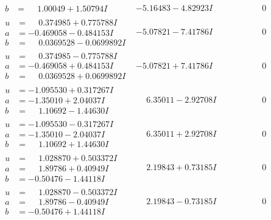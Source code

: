 \documentclass[1p]{elsarticle_modified}
\theoremstyle{definition}
\begin{document}
$$\begin{array}{c|c|c}
\begin{aligned}
b &= \phantom{-}1.00049 + 1.50794 I\end{aligned}
 & -5.16483 - 4.82923 I & \phantom{-0.000000 } 0 \\ \hline\begin{aligned}
u &= \phantom{-}0.374985 + 0.775788 I \\
a &= -0.469058 - 0.484153 I \\
b &= \phantom{-}0.0369528 - 0.0699892 I\end{aligned}
 & -5.07821 - 7.41786 I & \phantom{-0.000000 } 0 \\ \hline\begin{aligned}
u &= \phantom{-}0.374985 - 0.775788 I \\
a &= -0.469058 + 0.484153 I \\
b &= \phantom{-}0.0369528 + 0.0699892 I\end{aligned}
 & -5.07821 + 7.41786 I & \phantom{-0.000000 } 0 \\ \hline\begin{aligned}
u &= -1.095530 + 0.317267 I \\
a &= -1.35010 + 2.04037 I \\
b &= \phantom{-}1.10692 - 1.44630 I\end{aligned}
 & \phantom{-}6.35011 - 2.92708 I & \phantom{-0.000000 } 0 \\ \hline\begin{aligned}
u &= -1.095530 - 0.317267 I \\
a &= -1.35010 - 2.04037 I \\
b &= \phantom{-}1.10692 + 1.44630 I\end{aligned}
 & \phantom{-}6.35011 + 2.92708 I & \phantom{-0.000000 } 0 \\ \hline\begin{aligned}
u &= \phantom{-}1.028870 + 0.503372 I \\
a &= \phantom{-}1.89786 + 0.40949 I \\
b &= -0.50476 - 1.44118 I\end{aligned}
 & \phantom{-}2.19843 + 0.73185 I & \phantom{-0.000000 } 0 \\ \hline\begin{aligned}
u &= \phantom{-}1.028870 - 0.503372 I \\
a &= \phantom{-}1.89786 - 0.40949 I \\
b &= -0.50476 + 1.44118 I\end{aligned}
 & \phantom{-}2.19843 - 0.73185 I & \phantom{-0.000000 } 0 \\ \hline\begin{aligned}

\end{aligned}
\end{array}$$
\end{document}
